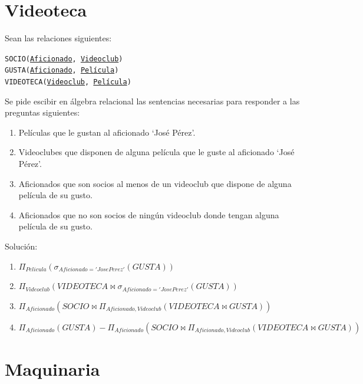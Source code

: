 \documentclass[a4paper]{article}
\begin{document}
\section{Videoteca}

Sean las relaciones siguientes:

\begin{addmargin}[1.5em]{0em}
    \texttt{SOCIO(\underline{Aficionado}, \underline{Videoclub})}\\
    \texttt{GUSTA(\underline{Aficionado}, \underline{Película})}\\
    \texttt{VIDEOTECA(\underline{Videoclub}, \underline{Película})}
\end{addmargin}

Se pide escibir en álgebra relacional las sentencias necesarias para responder a las preguntas siguientes:

\begin{enumerate}
    \item Películas que le gustan al aficionado `José Pérez'.
    \item Videoclubes que disponen de alguna película que le guste al aficionado `José Pérez'.
    \item Aficionados que son socios al menos de un videoclub que dispone de alguna película de su gusto.
    \item Aficionados que no son socios de ningún videoclub donde tengan alguna película de su gusto.
\end{enumerate}

\begin{solution}
    Solución:

    \begin{enumerate}
        \item $\Pi_{Pelicula} \left( \sigma_{Aficionado='Jose Perez'} \left( GUSTA \right) \right)$
        \item $\Pi_{Videoclub} \left( VIDEOTECA \bowtie \sigma_{Aficionado='Jose Perez'} \left( GUSTA \right) \right)$
        \item $\Pi_{Aficionado} \left( SOCIO \bowtie \Pi_{Aficionado,Videoclub} \left( VIDEOTECA \bowtie GUSTA \right) \right)$
        \item $\Pi_{Aficionado} \left( GUSTA \right) - \Pi_{Aficionado} \left( SOCIO \bowtie \Pi_{Aficionado,Videoclub} \left( VIDEOTECA \bowtie GUSTA \right) \right)$
    \end{enumerate}
\end{solution}

\section{Maquinaria}
\end{document}
